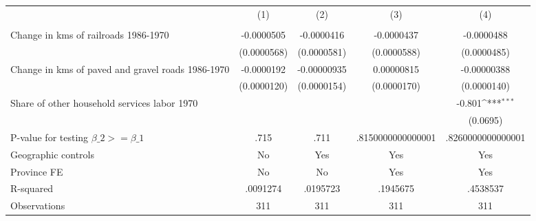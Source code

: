 {
\def\sym#1{\ifmmode^{#1}\else\(^{#1}\)\fi}
\begin{tabular}{l*{4}{c}}
\hline\hline
                &\multicolumn{1}{c}{(1)}&\multicolumn{1}{c}{(2)}&\multicolumn{1}{c}{(3)}&\multicolumn{1}{c}{(4)}\\
                &\multicolumn{1}{c}{}&\multicolumn{1}{c}{}&\multicolumn{1}{c}{}&\multicolumn{1}{c}{}\\
\hline
Change in kms of railroads 1986-1970&-0.0000505         &-0.0000416         &-0.0000437         &-0.0000488         \\
                &(0.0000568)         &(0.0000581)         &(0.0000588)         &(0.0000485)         \\
[1em]
Change in kms of paved and gravel roads 1986-1970&-0.0000192         &-0.00000935         &0.00000815         &-0.00000388         \\
                &(0.0000120)         &(0.0000154)         &(0.0000170)         &(0.0000140)         \\
[1em]
Share of other household services labor 1970&                  &                  &                  &   -0.801\sym{***}\\
                &                  &                  &                  & (0.0695)         \\
\hline
P-value for testing $\beta\_{2} >= \beta\_{1}$&     .715         &     .711         &.8150000000000001         &.8260000000000001         \\
Geographic controls&       No         &      Yes         &      Yes         &      Yes         \\
Province FE     &       No         &       No         &      Yes         &      Yes         \\
R-squared       & .0091274         & .0195723         & .1945675         & .4538537         \\
Observations    &      311         &      311         &      311         &      311         \\
\hline\hline
\end{tabular}
}
